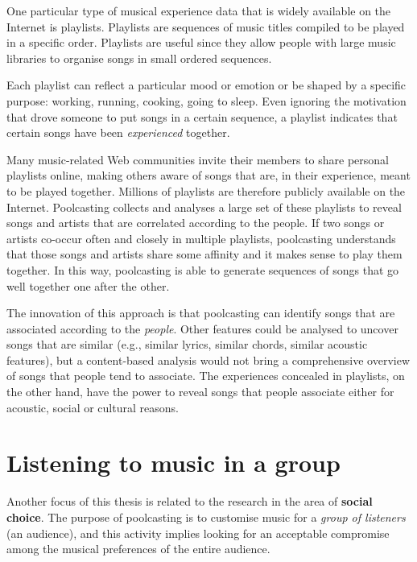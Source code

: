One particular type of musical experience data that is widely available on the Internet is playlists.
Playlists are sequences of music titles compiled to be played in a specific order. Playlists are useful since they allow people with large music libraries to organise songs in small ordered sequences.

Each playlist can reflect a particular mood or emotion or be shaped by a specific purpose: working, running, cooking, going to sleep.
Even ignoring the motivation that drove someone to put songs in a certain sequence, a playlist indicates that certain songs have been \emph{experienced} together.

Many music-related Web communities invite their members to share personal playlists online, making others aware of songs that are, in their experience, meant to be played together.
Millions of playlists are therefore publicly available on the Internet.
Poolcasting collects and analyses a large set of these playlists to reveal songs and artists that are correlated according to the people.
If two songs or artists co-occur often and closely in multiple playlists, poolcasting understands that those songs and artists share some affinity and it makes sense to play them together.
In this way, poolcasting is able to generate sequences of songs that go well together one after the other.

The innovation of this approach is that poolcasting can identify songs that are associated according to the \emph{people}. 
Other features could be analysed to uncover songs that are similar (e.g., similar lyrics, similar chords, similar acoustic features), but a content-based analysis would not bring a comprehensive overview of songs that people tend to associate. 
The experiences concealed in playlists, on the other hand, have the power to reveal songs that people associate either for acoustic, social or cultural reasons.


\section{Listening to music in a group} %
\label{sec:listening_to_music_in_a_group97}

Another focus of this thesis is related to the research in the area of \textbf{social choice}.
The purpose of poolcasting is to customise music for a \emph{group of listeners} (an audience), and this activity implies looking for an acceptable compromise among the musical preferences of the entire audience.

